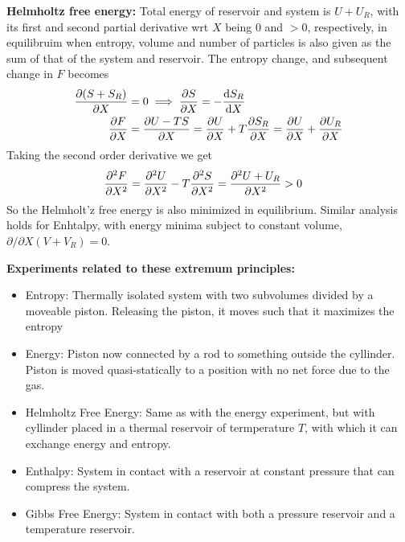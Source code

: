 \documentclass[a4paper, english, 12pt]{article}
\begin{document}
\begin{multicols*}{2}
\textbf{Helmholtz free energy:} Total energy of reservoir and system is $U+U_R$, with its first and second partial derivative wrt $X$ being $0$ and $>0$, respectively, in equilibruim when entropy, volume and number of particles is also given as the sum of that of the system and reservoir. The entropy change, and subsequent change in $F$ becomes 
\begin{align*}
    \pdv{(S+S_R)}{X} &= 0 \implies \pdv{S}{X} = - \dv{S_R}{X} \\ 
    \pdv{F}{X} &= \pdv{U-TS}{X} = \pdv{U}{X} + T\pdv{S_R}{X} = \pdv{U}{X} + \pdv{U_R}{X}
\end{align*}
Taking the second order derivative we get 
\begin{align*}
    \pdv[2]{F}{X} &= \pdv[2]{U}{X} - T \pdv[2]{S}{X} = \pdv[2]{U+U_R}{X} > 0
\end{align*} 
So the Helmholt'z free energy is also minimized in equilibrium. Similar analysis holds for Enhtalpy, with energy minima subject to constant volume, $\partial/\partial X (V+V_R)=0$. 


\textbf{Experiments related to these extremum principles:}
\begin{itemize}
    \item Entropy: Thermally isolated system with two subvolumes divided by a moveable piston. Releasing the piston, it moves such that it maximizes the entropy
    \item Energy: Piston now connected by a rod to something outside the cyllinder. Piston is moved quasi-statically to a position with no net force due to the gas. 
    \item Helmholtz Free Energy: Same as with the energy experiment, but with cyllinder placed in a thermal reservoir of termperature $T$, with which it can exchange energy and entropy. 
    \item Enthalpy: System in contact with a reservoir at constant pressure that can compress the system.   
    \item Gibbs Free Energy: System in contact with both a pressure reservoir and a temperature reservoir.   
\end{itemize}



\end{multicols*}
\end{document}
